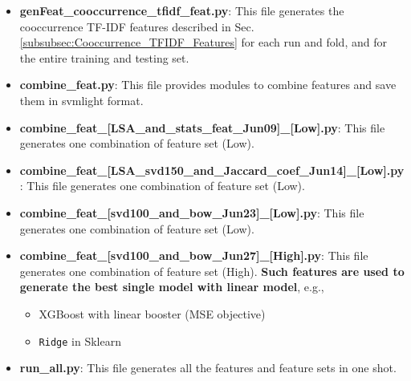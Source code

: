 \documentclass[12pt]{article}
\begin{document}
\begin{itemize}
\item \textbf{genFeat\_cooccurrence\_tfidf\_feat.py}: This file generates the cooccurrence TF-IDF features described in Sec. \ref{subsubsec:Cooccurrence_TFIDF_Features} for each run and fold, and for the entire training and testing set.
\item \textbf{combine\_feat.py}: This file provides modules to combine features and save them in svmlight format.
\item \textbf{combine\_feat\_[LSA\_and\_stats\_feat\_Jun09]\_[Low].py}: This file generates one combination of feature set (Low).
\item \textbf{combine\_feat\_[LSA\_svd150\_and\_Jaccard\_coef\_Jun14]\_[Low].py}: This file generates one combination of feature set (Low).
\item \textbf{combine\_feat\_[svd100\_and\_bow\_Jun23]\_[Low].py}: This file generates one combination of feature set (Low).
\item \textbf{combine\_feat\_[svd100\_and\_bow\_Jun27]\_[High].py}: This file generates one combination of feature set (High).
    \textbf{Such features are used to generate the best single model with linear model}, e.g.,
    \begin{itemize}
        \item XGBoost with linear booster (MSE objective)
        \item \texttt{Ridge} in Sklearn
    \end{itemize}
\item \textbf{run\_all.py}: This file generates all the features and feature sets in one shot.
\end{itemize}
\end{document}
